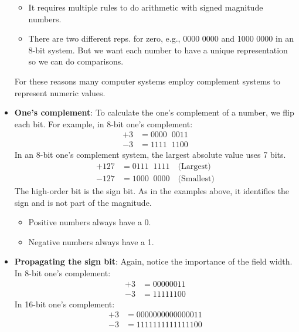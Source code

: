 \documentclass{report}
\begin{document}
\begin{itemize}
            \begin{itemize}
                \item It requires multiple rules to do arithmetic with signed magnitude numbers.
                \item There are two different reps. for zero, e.g., 0000 0000 and 1000 0000 in an 8-bit system.
                    \bigbreak \noindent 
                    But we want each number to have a unique representation so we can do comparisons.
            \end{itemize}
            For these reasons many computer systems employ complement systems to represent numeric values.
        \item \textbf{One's complement}: To calculate the one’s complement of a number, we flip each bit.
            \bigbreak \noindent 
            For example, in 8-bit one’s complement:
            \begin{align*}
                +3 &= 0000 \;\; 0011 \\
                -3 &= 1111 \;\; 1100
            \end{align*}
            In an 8-bit one’s complement system, the largest absolute value uses 7 bits.
            \begin{align*}
                +127 &= 0111 \;\; 1111 \quad \text{(Largest)} \\
                -127 &= 1000 \;\; 0000 \quad \text{(Smallest)}
            \end{align*}
            The high-order bit is the sign bit. As in the examples above, it identifies the sign and is not part of the magnitude.
            \begin{itemize}
                \item Positive numbers always have a 0.
                \item Negative numbers always have a 1.
            \end{itemize}
        \item \textbf{Propagating the sign bit}: Again, notice the importance of the field width. In 8-bit one’s complement:
            \begin{align*}
                +3 &= 0000 0011 \\
                -3 &= 1111 1100
            \end{align*}
            In 16-bit one’s complement:
            \begin{align*}
                +3 &= 0000 0000 0000 0011 \\
                -3 &= 1111 1111 1111 1100

\end{align*}
\end{itemize}
\end{document}
